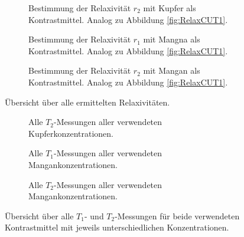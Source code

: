 \begin{figure}[H]
    \begin{subfigure}[b]{0.5\textwidth}
        \centering
        \resizebox{1\textwidth}{!}{}
        \caption{Bestimmung der Relaxivität $r_2$ mit Kupfer als Kontrastmittel. Analog zu Abbildung \ref{fig:RelaxCUT1}.}
        \label{fig:RelaxCUT2}
    \end{subfigure}
    \begin{subfigure}[b]{0.5\textwidth}
        \centering
        \resizebox{1\textwidth}{!}{}
        \caption{Bestimmung der Relaxivität $r_1$ mit Mangna als Kontrastmittel. Analog zu Abbildung \ref{fig:RelaxCUT1}.}
        \label{fig:RelaxMNT1}
    \end{subfigure}
    \begin{subfigure}[b]{1\textwidth}
        \centering
        \resizebox{0.5\textwidth}{!}{}
        \caption{Bestimmung der Relaxivität $r_2$ mit Mangan als Kontrastmittel. Analog zu Abbildung \ref{fig:RelaxCUT1}.}
        \label{fig:RelaxMNT2}
    \end{subfigure}
    \caption{Übersicht über alle ermittelten Relaxivitäten.}
    \label{fig:RelaxAlle}
\end{figure}




\begin{figure}[H]
    \begin{subfigure}[b]{0.5\textwidth}
        \centering
        \resizebox{1\textwidth}{!}{}
        \caption{Alle $T_2$-Messungen aller verwendeten Kupferkonzentrationen.}
        \label{fig:T2CU}
    \end{subfigure}
    \begin{subfigure}[b]{0.5\textwidth}
        \centering
        \resizebox{1\textwidth}{!}{}
        \caption{Alle $T_1$-Messungen aller verwendeten Mangankonzentrationen.}
        \label{fig:T1Mn}
    \end{subfigure}
    \begin{subfigure}[b]{1\textwidth}
        \centering
        \resizebox{0.5\textwidth}{!}{}
        \caption{Alle $T_2$-Messungen aller verwendeten Mangankonzentrationen.}
        \label{fig:T2Mn}
    \end{subfigure}
    \caption{Übersicht über alle $T_1$- und $T_2$-Messungen für beide verwendeten Kontrastmittel mit jeweils unterschiedlichen Konzentrationen.}
    \label{fig:RelaxZeitAlle}
\end{figure}
